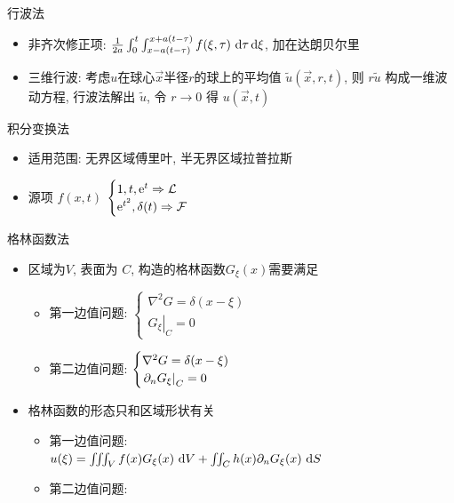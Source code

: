 \documentclass[landscape,a4paper]{ctexart}
\begin{document}
\begin{cheatsheetcolumns}
\begin{card}{行波法}
\begin{itemize}
			\item 非齐次修正项: $\frac{1}{2a}\int_0^t\int_{x-a(t-\tau)}^{x+a(t-\tau)}f(\xi,\tau)\,\odif{\tau,\xi}$, 加在达朗贝尔里
			\item 三维行波: 考虑$u$在球心$\vec{x}$半径$r$的球上的平均值 $\tilde{u}(\vec{x},r,t)$, 则 $r\tilde{u}$ 构成一维波动方程, 行波法解出 $\tilde{u}$, 令 $r\to 0$ 得 $u(\vec{x},t)$
			\end{itemize}
		\end{card}
		\begin{card}{积分变换法}
			\begin{itemize}
				\item 适用范围: 无界区域傅里叶, 半无界区域拉普拉斯
				\item 源项 $f(x,t)$ $\begin{cases}1,t,\mathrm{e}^t\Rightarrow \mathcal L\\\mathrm{e}^{t^2},\delta(t)\Rightarrow \mathcal F\end{cases}$
			\end{itemize}
		\end{card}
		\begin{card}{格林函数法}
			\begin{itemize}
				\item 区域为$V$, 表面为 $C$, 构造的格林函数$G_\xi(x)$需要满足
				\begin{itemize}
					\item 第一边值问题: $\begin{cases}
						\nabla^2G=\delta(x-\xi)\\
						\left.G_\xi\right|_{C}=0
						\end{cases}$\\
					\item 第二边值问题: $\begin{cases}
						\nabla^2G=\delta(x-\xi)\\
						\left.\pdv{G_\xi}!{n}\right|_{C}=0
					\end{cases}$\\
				\end{itemize}
				\item 格林函数的形态只和区域形状有关\\
				\begin{itemize}
					\item 第一边值问题: \\
					$u(\xi)=\iiint_V f(x)G_\xi(x)\,\odif{V}+\iint_C h(x)\pdv{G_\xi}!{n}(x)\,\odif{S}$
					\item 第二边值问题: \\

\end{itemize}
\end{itemize}
\end{card}
\end{cheatsheetcolumns}
\end{document}
